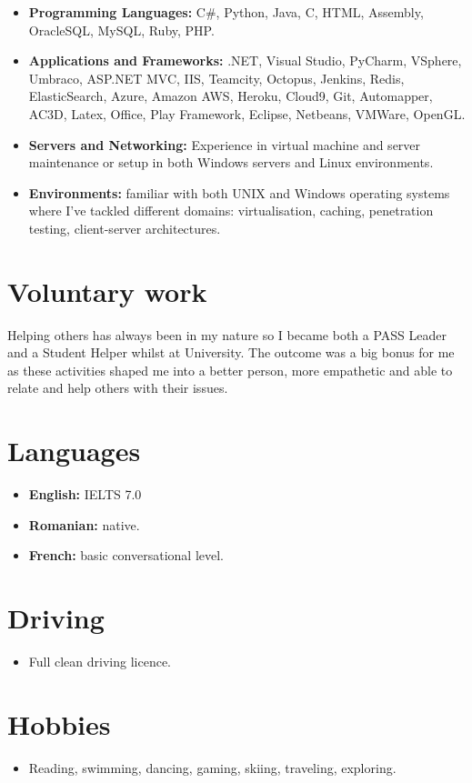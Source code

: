 \documentclass[12pt,a4paper]{res}
\begin{document}
\begin{resume}
\begin{itemize}
  \item[] {\bf Programming Languages:} C\#, Python, Java, C, HTML, Assembly, OracleSQL, MySQL, Ruby, PHP.
  \item[] {\bf Applications and Frameworks:} .NET, Visual Studio, PyCharm, VSphere, Umbraco, ASP.NET MVC, IIS, Teamcity, Octopus, Jenkins, Redis, ElasticSearch, Azure, Amazon AWS, Heroku, Cloud9, Git, Automapper, AC3D, Latex, Office, Play Framework, Eclipse, Netbeans, VMWare, OpenGL.
  \item[] {\bf Servers and Networking:} Experience in virtual machine and server maintenance or setup in both Windows servers and Linux environments.
  \item[] {\bf Environments:} familiar with both UNIX and Windows operating systems where I've tackled different domains: virtualisation, caching, penetration testing, client-server architectures.
  \end{itemize}
\vspace{-3mm}
      
\section{\large\bf Voluntary work}
\vspace{2mm}
Helping others has always been in my nature so I became both a PASS Leader and a Student Helper whilst at University. The outcome was a big bonus for me as these activities shaped me into a better person, more empathetic and able to relate and help others with their issues.
\vspace{-3mm}
    
\section{Languages}
\vspace{-0.7mm}
\begin{itemize}
\item[] {\bf English:} IELTS 7.0
\item[] {\bf Romanian:} native.
\item[] {\bf French:} basic conversational level.
\end{itemize}
\vspace{-3mm}

\section{Driving}
\vspace{-0.7mm}
\begin{itemize}
\item[] Full clean driving licence.
\end{itemize}
  \vspace{-3mm}
  
\section{Hobbies}
\vspace{-0.7mm}
  \begin{itemize}
  \item[] Reading, swimming, dancing, gaming, skiing, traveling, exploring.
  \end{itemize}

\end{resume}
\end{document}
